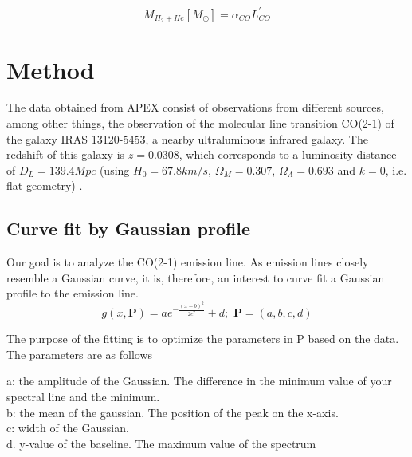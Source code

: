 \documentclass[reprint,english,notitlepage]{revtex4-2}  %
\begin{document}
\begin{equation} \label{total molecular gas mass}
    M_{H_2 + He}[M_{\odot}]= \alpha_{CO}L_{CO}^{'}
\end{equation}

\section{Method}
The data obtained from APEX consist of observations from different sources, among other things, the observation of
the molecular line transition CO(2-1) of the galaxy IRAS 13120-5453, a nearby ultraluminous infrared galaxy. The redshift of this galaxy is $z = 0.0308$, which corresponds to a luminosity distance of $D_L = 139.4 Mpc$ (using $H_0 = 67.8 km/s$, $\Omega_M = 0.307$, $\Omega_\Lambda = 0.693$ and $k = 0$, i.e. flat geometry) \cite{task description}.

\subsection{Curve fit by Gaussian profile}

Our goal is to analyze the CO(2-1) emission line. As emission lines closely resemble a Gaussian curve, it is, therefore, an interest to curve fit a Gaussian profile to the emission line.
\begin{equation} \label{gaussian}
    g(x, \mathbf{P})=ae^{-\frac{(x - b)^2}{2c^2}} + d; \textbf{ P} = (a, b, c, d)
    \label{eq: gauss}
\end{equation}

The purpose of the fitting is to optimize the parameters in P based on the data. The parameters are as follows

\indent a: the amplitude of the Gaussian. The difference in the minimum value of your spectral line and the minimum.\\
\indent b: the mean of the gaussian. The position of the peak on the x-axis.\\
\indent c: width of the Gaussian.\\
\indent d. y-value of the baseline. The maximum value of the spectrum \\
\end{document}
